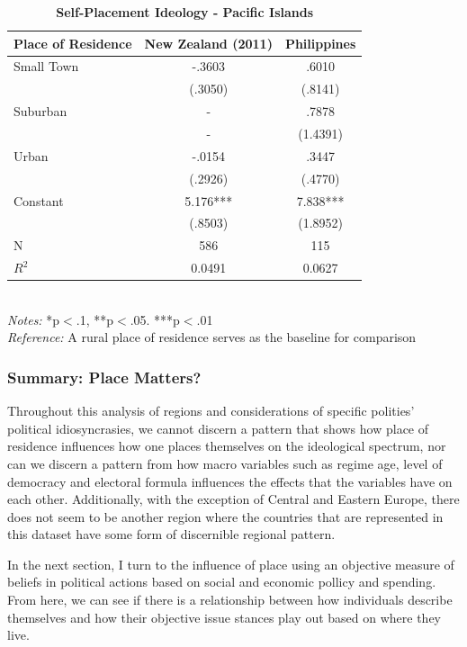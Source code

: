 \documentclass[12pt, titlepage]{article}
\newcommand\e{\emph}
\newcommand\tb{\textbf}
\begin{document}
\begin{singlespace}
	\begin{table}[H]
		\centering
		\caption{\tb{Self-Placement Ideology - Pacific Islands}}
		\begin{tabulary}{\linewidth}{l c c }
			\\
			\hline
			\tb{Place of Residence}&\tb{New Zealand (2011)}&\tb{Philippines}\\
			\hline
			Small Town & -.3603  & .6010  \\      
			& (.3050) & (.8141)    \\
			Suburban  & -   & .7878  \\ 
			 & -   & (1.4391)       \\
			Urban  & -.0154   & .3447 \\
			 &(.2926)   & (.4770)      \\
			Constant  & 5.176***  & 7.838***   \\
			&(.8503)&(1.8952) \\
			N  &586 & 115  \\
			$R^2$  &0.0491  &0.0627     \\
			\hline                                       
		\end{tabulary} 
		\\
		\e{Notes:} *p$<$.1, **p$<$.05. ***p$<$.01 \\
		\e{Reference:} A rural place of residence serves as the baseline for comparison
		\label{table13}
	\end{table}
\end{singlespace}


\subsubsection{Summary: Place Matters?}

Throughout this analysis of regions and considerations of specific polities' political idiosyncrasies, we cannot discern a pattern that shows how place of residence influences how one places themselves on the ideological spectrum, nor can we discern a pattern from how macro variables such as regime age, level of democracy and electoral formula influences the effects that the variables have on each other. Additionally, with the exception of Central and Eastern Europe, there does not seem to be another region where the countries that are represented in this dataset have some form of discernible regional pattern.

In the next section, I turn to the influence of place using an objective measure of beliefs in political actions based on social and economic pollicy and spending. From here, we can see if there is a relationship between how individuals describe themselves and how their objective issue stances play out based on where they live.
\end{document}
